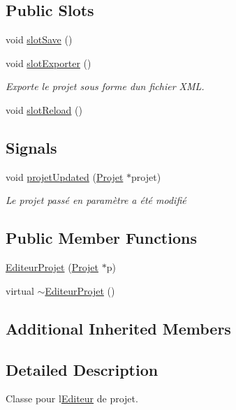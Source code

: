 \subsection*{Public Slots}
\begin{DoxyCompactItemize}
\item 
void \hyperlink{class_editeur_projet_a9982e3188058e70345faf052aedf6325}{slot\+Save} ()
\item 
void \hyperlink{class_editeur_projet_acb6efff25441f2b8f4c5507dc5b90cf5}{slot\+Exporter} ()
\begin{DoxyCompactList}\small\item\em Exporte le projet sous forme d\textquotesingle{}un fichier X\+M\+L. \end{DoxyCompactList}\item 
void \hyperlink{class_editeur_projet_a8a527a6cf36fe24036e47735ebadd735}{slot\+Reload} ()
\end{DoxyCompactItemize}
\subsection*{Signals}
\begin{DoxyCompactItemize}
\item 
void \hyperlink{class_editeur_projet_afcab9b5c1e80acfa8a33e1bf64bcf85f}{projet\+Updated} (\hyperlink{class_projet}{Projet} $\ast$projet)
\begin{DoxyCompactList}\small\item\em Le projet passé en paramètre a été modifié \end{DoxyCompactList}\end{DoxyCompactItemize}
\subsection*{Public Member Functions}
\begin{DoxyCompactItemize}
\item 
\hyperlink{class_editeur_projet_acde1e8bcea74603569215c0cd2331258}{Editeur\+Projet} (\hyperlink{class_projet}{Projet} $\ast$p)
\item 
virtual \hyperlink{class_editeur_projet_a5fb06458b4bd5d5df9d57915adb1e2ce}{$\sim$\+Editeur\+Projet} ()
\end{DoxyCompactItemize}
\subsection*{Additional Inherited Members}


\subsection{Detailed Description}
Classe pour l\textquotesingle{}\hyperlink{class_editeur}{Editeur} de projet. 

